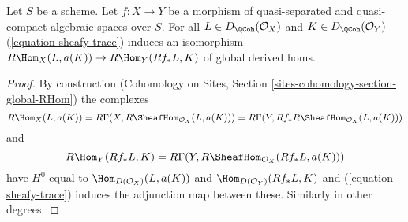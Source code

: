 \begin{lemma}
\label{lemma-iso-global-hom}
Let $S$ be a scheme.
Let $f : X \to Y$ be a morphism of quasi-separated and quasi-compact
algebraic spaces over $S$.
For all $L \in D_\QCoh(\mathcal{O}_X)$ and $K \in D_\QCoh(\mathcal{O}_Y)$
(\ref{equation-sheafy-trace}) induces an isomorphism
$R\Hom_X(L, a(K)) \to R\Hom_Y(Rf_*L, K)$ of global derived homs.
\end{lemma}

\begin{proof}
By construction (Cohomology on Sites, Section
\ref{sites-cohomology-section-global-RHom}) the complexes
$$
R\Hom_X(L, a(K)) =
R\Gamma(X, R\SheafHom_{\mathcal{O}_X}(L, a(K))) =
R\Gamma(Y, Rf_*R\SheafHom_{\mathcal{O}_X}(L, a(K)))
$$
and
$$
R\Hom_Y(Rf_*L, K) = R\Gamma(Y, R\SheafHom_{\mathcal{O}_X}(Rf_*L, a(K)))
$$
have $H^0$ equal to $\Hom_{D(\mathcal{O}_X)}(L, a(K))$ and
$\Hom_{D(\mathcal{O}_Y)}(Rf_*L, K)$ and
(\ref{equation-sheafy-trace}) induces the adjunction map
between these. Similarly in other degrees.
\end{proof}













